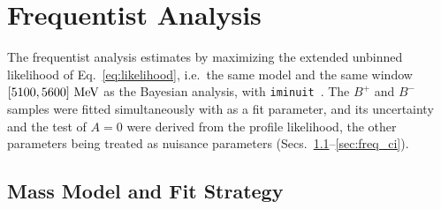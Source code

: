 \section{Frequentist Analysis}
\label{sec:frequentist}

The frequentist analysis estimates \Araw by maximizing the extended unbinned likelihood of Eq.~\eqref{eq:likelihood}, i.e.\ the same model and the same window $[5100,5600]\,\,\text{Me\hspace{-.08em}V}$ as the Bayesian analysis, with \texttt{iminuit}~\cite{iminuit}. The $B^+$ and $B^-$ samples were fitted simultaneously with \Araw as a fit parameter, and its uncertainty and the test of $A=0$ were derived from the profile likelihood, the other parameters being treated as nuisance parameters (Secs.~\ref{sec:freq_model}--\ref{sec:freq_ci}).


\subsection{Mass Model and Fit Strategy}
\label{sec:freq_model}

